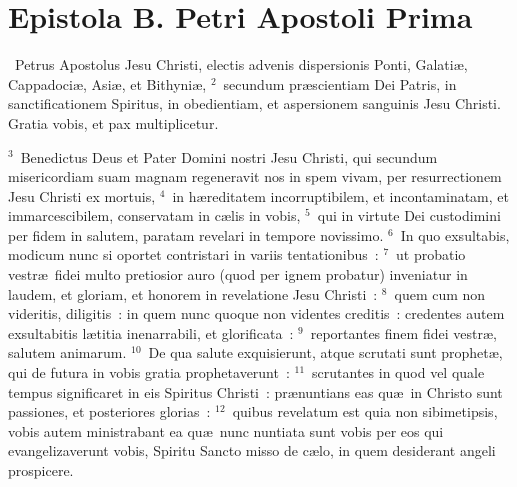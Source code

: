 {\centering \section*{Epistola B. Petri Apostoli Prima}}\thispagestyle{empty}

~Petrus Apostolus Jesu Christi, electis advenis dispersionis Ponti, Galati\ae , Cappadoci\ae , Asi\ae , et Bithyni\ae ,
${}^{2}$~secundum pr\ae scientiam Dei Patris, in sanctificationem Spiritus, in obedientiam, et aspersionem sanguinis Jesu Christi. Gratia vobis, et pax multiplicetur.


${}^{3}$~Benedictus Deus et Pater Domini nostri Jesu Christi, qui secundum misericordiam suam magnam regeneravit nos in spem vivam, per resurrectionem Jesu Christi ex mortuis,
${}^{4}$~in h\ae reditatem incorruptibilem, et incontaminatam, et immarcescibilem, conservatam in c\ae lis in vobis,
${}^{5}$~qui in virtute Dei custodimini per fidem in salutem, paratam revelari in tempore novissimo.
${}^{6}$~In quo exsultabis, modicum nunc si oportet contristari in variis tentationibus~:
${}^{7}$~ut probatio vestr\ae\ fidei multo pretiosior auro (quod per ignem probatur) inveniatur in laudem, et gloriam, et honorem in revelatione Jesu Christi~:
${}^{8}$~quem cum non videritis, diligitis~: in quem nunc quoque non videntes creditis~: credentes autem exsultabitis l\ae titia inenarrabili, et glorificata~:
${}^{9}$~reportantes finem fidei vestr\ae , salutem animarum.
${}^{10}$~De qua salute exquisierunt, atque scrutati sunt prophet\ae , qui de futura in vobis gratia prophetaverunt~:
${}^{11}$~scrutantes in quod vel quale tempus significaret in eis Spiritus Christi~: pr\ae nuntians eas qu\ae\ in Christo sunt passiones, et posteriores glorias~:
${}^{12}$~quibus revelatum est quia non sibimetipsis, vobis autem ministrabant ea qu\ae\ nunc nuntiata sunt vobis per eos qui evangelizaverunt vobis, Spiritu Sancto misso de c\ae lo, in quem desiderant angeli prospicere.


